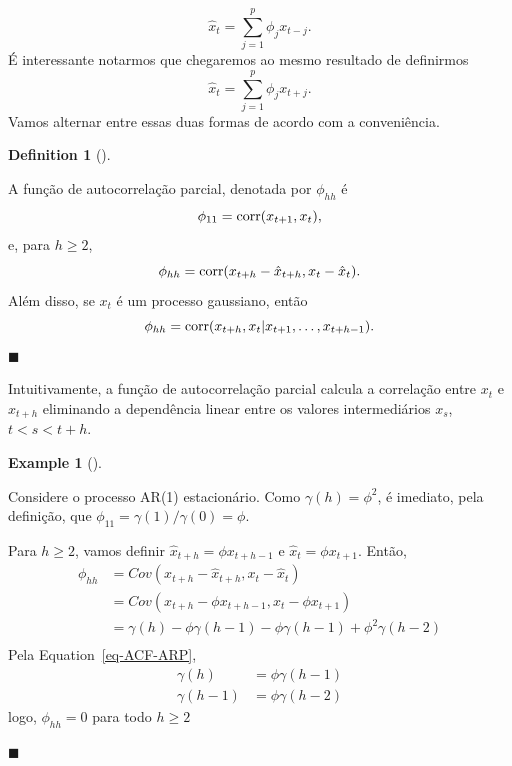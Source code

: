 \documentclass[
  letterpaper,
  DIV=11,
  numbers=noendperiod]{scrartcl}
\theoremstyle{definition}
\newtheorem{example}{Example}[chapter]
\theoremstyle{definition}
\newtheorem{definition}{Definition}[chapter]
\theoremstyle{plain}
\theoremstyle{plain}
\theoremstyle{remark}
\begin{document}
\[\hat{x}_t=\sum_{j=1}^p\phi_jx_{t-j}.\] É interessante notarmos que
chegaremos ao mesmo resultado de definirmos
\[\hat{x}_t=\sum_{j=1}^p \phi_j x_{t+j}.\] Vamos alternar entre essas
duas formas de acordo com a conveniência.

\begin{definition}[]\protect\hypertarget{def-}{}\label{def-}

A função de autocorrelação parcial, denotada por \(\phi_{hh}\) é
\[\phi_{11}=\hbox{corr}(x_{t+1},x_t),\] e, para \(h\geq 2\),
\[\phi_{hh}=\hbox{corr}(x_{t+h}-\hat{x}_{t+h},x_t-\hat{x}_t
).\] Além disso, se \(x_t\) é um processo gaussiano, então
\[\phi_{hh}=\hbox{corr}(x_{t+h},x_t|x_{t+1},\ldots,x_{t+h-1}).\]
\(\blacksquare\)

\end{definition}

Intuitivamente, a função de autocorrelação parcial calcula a correlação
entre \(x_t\) e \(x_{t+h}\) eliminando a dependência linear entre os
valores intermediários \(x_s\), \(t<s<t+h\).

\begin{example}[]\protect\hypertarget{exm-}{}\label{exm-}

Considere o processo AR(1) estacionário. Como \(\gamma(h)=\phi^2\), é
imediato, pela definição, que \(\phi_{11}=\gamma(1)/\gamma(0)=\phi\).

Para \(h\geq 2\), vamos definir \(\hat{x}_{t+h}=\phi x_{t+h-1}\) e
\(\hat{x}_t=\phi x_{t+1}\). Então,
\begin{align}\phi_{hh}&=Cov( x_{t+h}-\hat{x}_{t+h},x_t-\hat{x}_t)\\&=Cov( x_{t+h}-\phi x_{t+h-1},x_t-\phi x_{t+1})\\&=
\gamma(h)-\phi\gamma(h-1)-\phi\gamma(h-1)+\phi^2\gamma(h-2)\\
\end{align} Pela Equation~\ref{eq-ACF-ARP},
\begin{align}\gamma(h)&=\phi \gamma(h-1)\\ \gamma(h-1)&=\phi\gamma(h-2) \end{align}
logo, \(\phi_{hh}=0\) para todo \(h\geq 2\)

\(\blacksquare\)

\end{example}
\end{document}
